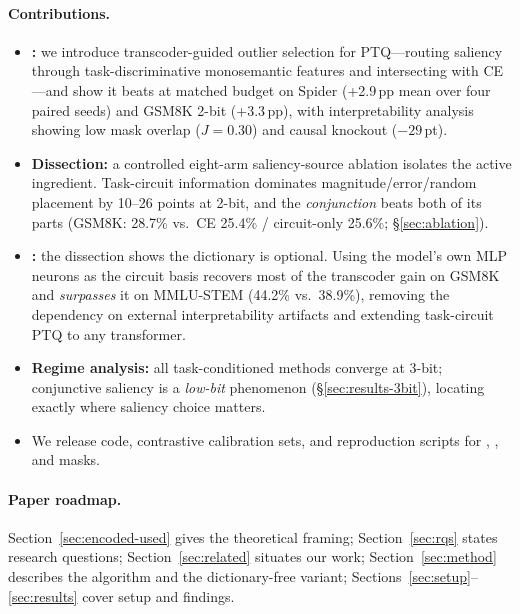 \paragraph{Contributions.}
\begin{itemize}
  \item \textbf{\method{}:} we introduce transcoder-guided outlier selection
        for PTQ---routing saliency through task-discriminative monosemantic
        features and intersecting with CE---and show it beats \baseline{} at
        matched budget on Spider (+2.9\,pp mean over four paired seeds) and
        GSM8K 2-bit (+3.3\,pp), with interpretability analysis showing low
        mask overlap ($J{=}0.30$) and causal knockout ($-29$\,pt).
  \item \textbf{Dissection:} a controlled eight-arm saliency-source ablation
        isolates the active ingredient. Task-circuit information dominates
        magnitude/error/random placement by 10--26 points at 2-bit, and the
        \emph{conjunction} beats both of its parts (GSM8K: 28.7\% vs.\ CE
        25.4\% / circuit-only 25.6\%; \S\ref{sec:ablation}).
  \item \textbf{\methodfree{}:} the dissection shows the dictionary is
        optional. Using the model's own MLP neurons as the circuit basis
        recovers most of the transcoder gain on GSM8K and \emph{surpasses} it
        on MMLU-STEM (44.2\% vs.\ 38.9\%), removing the dependency on external
        interpretability artifacts and extending task-circuit PTQ to any
        transformer.
  \item \textbf{Regime analysis:} all task-conditioned methods converge at
        3-bit; conjunctive saliency is a \emph{low-bit} phenomenon
        (\S\ref{sec:results-3bit}), locating exactly where saliency choice
        matters.
  \item We release code, contrastive calibration sets, and reproduction
        scripts for \baseline{}, \method{}, and \methodfree{} masks.
\end{itemize}

\paragraph{Paper roadmap.}
Section~\ref{sec:encoded-used} gives the theoretical framing;
Section~\ref{sec:rqs} states research questions;
Section~\ref{sec:related} situates our work;
Section~\ref{sec:method} describes the algorithm and the dictionary-free
variant; Sections~\ref{sec:setup}--\ref{sec:results} cover setup and findings.
